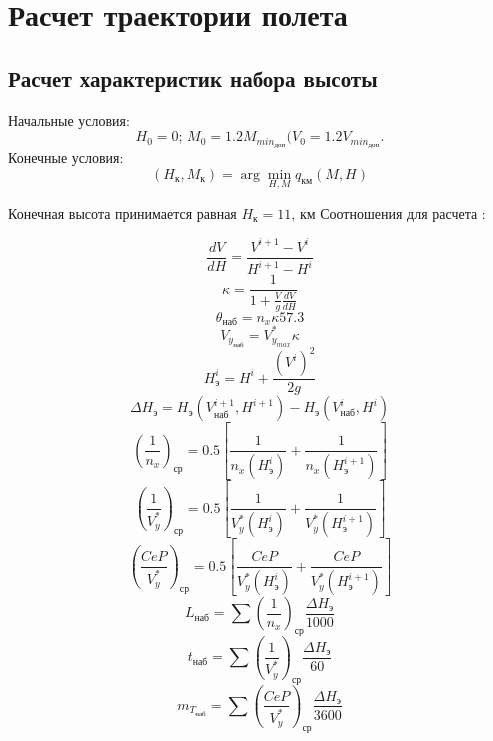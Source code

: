 \chapter{Расчет траектории полета}

\section{Расчет характеристик набора высоты}

Начальные условия:
\[
    H_0 = 0;\, M_0 = 1.2 M_{{min}_{доп}}(V_0 = 1.2 V_{{min}_{доп}}.
\]
Конечные условия: 
\[
    (H_к, M_к) = \arg \min_{H, M} q_{км} (M, H)
\]

Конечная высота принимается равная $H_к = 11, \, \text{км}$
Соотношения для расчета :

\begin{equation}
    \frac{dV}{dH} = \frac{V^{i + 1} - V^i}{H^{i + 1} - H^i}
\end{equation}
\begin{equation}
    \kappa = \frac{1}{1 + \frac{V}{g} \frac{d {V}}{d {H}}}
\end{equation}
\begin{equation}
    \theta_{наб} = n_x \kappa 57.3
\end{equation}
\begin{equation}
    V_{y_{наб}} = V_{y_{max}}^* \kappa
\end{equation}
\begin{equation}
    H_э^i = H^i + \frac{(V^i)^2}{2g}
\end{equation}
\begin{equation}
    \Delta H_э = H_э (V_{наб}^{i+1}, H^{i+1}) - H_э (V_{наб}^{i}, H^{i})
\end{equation}
\begin{equation}
    \left( \frac{1}{n_x} \right)_{ср}  = 0.5 \left[ \frac{1}{n_x(H_э^i)} + \frac{1}{n_x(H_э^{i+1})} \right] 
\end{equation}
\begin{equation}
    \left( \frac{1}{V_y^*} \right)_{ср}  = 0.5 \left[ \frac{1}{V_y^*(H_э^i)} + \frac{1}{V_y^*(H_э^{i+1})} \right] 
\end{equation}
\begin{equation}
    \left( \frac{CeP}{V_y^*} \right)_{ср}  = 0.5 \left[ \frac{CeP}{V_y^*(H_э^i)} + \frac{CeP}{V_y^*(H_э^{i+1})} \right] 
\end{equation}
\begin{equation}
    L_{наб} = \sum \left( \frac{1}{n_x} \right)_{ср} \frac{\Delta H_{э}}{1000}
\end{equation}
\begin{equation}
    t_{наб} = \sum \left( \frac{1}{V_y^*} \right)_{ср} \frac{\Delta H_{э}}{60}
\end{equation}
\begin{equation}
    m_{T_{наб}} = \sum \left( \frac{CeP}{V_y^*} \right)_{ср} \frac{\Delta H_{э}}{3600}
\end{equation}




